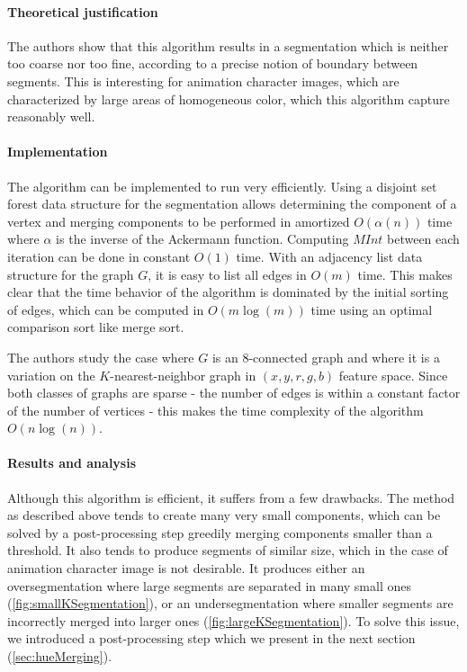 \paragraph{Theoretical justification} The authors show that this algorithm results in a segmentation which is neither too coarse nor too fine, according to a precise notion of boundary between segments. This is interesting for animation character images, which are characterized by large areas of homogeneous color, which this algorithm capture reasonably well.

\paragraph{Implementation} The algorithm can be implemented to run very efficiently. Using a disjoint set forest data structure for the segmentation allows determining the component of a vertex and merging components to be performed in amortized $O(\alpha(n))$ time where $\alpha$ is the inverse of the Ackermann function. Computing $MInt$ between each iteration can be done in constant $O(1)$ time. With an adjacency list data structure for the graph $G$, it is easy to list all edges in $O(m)$ time. This makes clear that the time behavior of the algorithm is dominated by the initial sorting of edges, which can be computed in $O(m\log(m))$ time using an optimal comparison sort like merge sort.

The authors study the case where $G$ is an $8$-connected graph and where it is a variation on the $K$-nearest-neighbor graph\footnotemark
{}
 in $(x, y, r, g, b)$ feature space. Since both classes of graphs are sparse - the number of edges is within a constant factor of the number of vertices - this makes the time complexity of the algorithm $O(n\log(n))$.

\paragraph{Results and analysis} Although this algorithm is efficient, it suffers from a few drawbacks. The method as described above tends to create many very small components, which can be solved by a post-processing step greedily merging components smaller than a threshold. It also tends to produce segments of similar size, which in the case of animation character image is not desirable. It produces either an oversegmentation where large segments are separated in many small ones (\autoref{fig:smallKSegmentation}), or an undersegmentation where smaller segments are incorrectly merged into larger ones (\autoref{fig:largeKSegmentation}). To solve this issue, we introduced a post-processing step which we present in the next section (\autoref{sec:hueMerging}).


